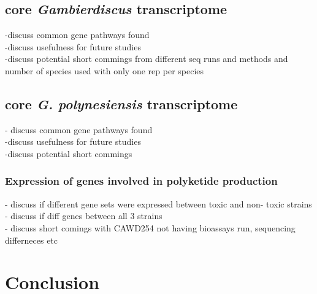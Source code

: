 \documentclass[12pt]{article}
\begin{document}
\subsection*{core \textit{Gambierdiscus} transcriptome}
-discuss common gene pathways found\\
-discuss usefulness for future studies\\
-discuss potential short commings from different seq runs and methods and number of species used with only one rep per species

\subsection*{core \textit{G. polynesiensis} transcriptome}
- discuss common gene pathways found \\
-discuss usefulness for future studies\\
-discuss potential short commings
\subsubsection*{Expression of genes involved in polyketide production}
- discuss if different gene sets were expressed between toxic and non- toxic strains\\
- discuss if diff genes between all 3 strains\\
- discuss short comings with CAWD254 not having bioassays run, sequencing differneces etc

\section*{Conclusion}


\newpage


\end{document}
